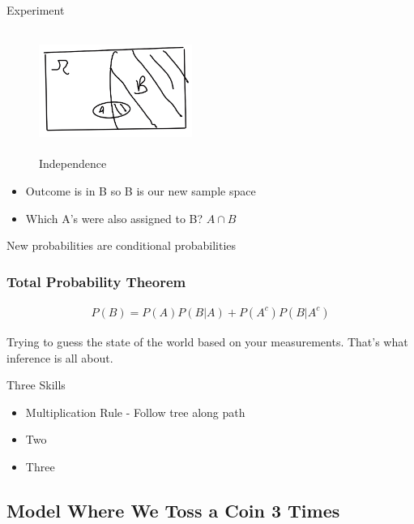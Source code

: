 

Experiment

\begin{figure}[ht]
\centering
\includegraphics[width=5cm, height=4cm]{images/L03/independence.jpeg}
\caption{Independence}
\end{figure}

\begin{itemize}
    \item Outcome is in B so B is our new sample space
    \item Which A's were also assigned to B? $A \cap B$
\end{itemize}

New probabilities are conditional probabilities

\subsubsection*{Total Probability Theorem}

\begin{align*}
P(B)=P(A)P(B|A) + P(A^c)P(B|A^c)
\end{align*}

 Trying to guess the state of the world based on your measurements.  That's what inference is all about.


Three Skills
\begin{itemize}
    \item Multiplication Rule - Follow tree along path
    \item Two
    \item Three
\end{itemize}

\subsection{Model Where We Toss a Coin 3 Times}

